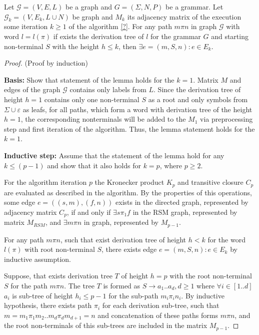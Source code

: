 \begin{lemma}
    \label{lemma:algo:completeness}
    Let $\mathcal{G} = (V,E,L)$ be a graph and  $G = (\Sigma, N, P)$ be a grammar. 
    Let $\mathcal{G}_k = (V,E_k,L \cup N)$ be graph and $M_k$ its adjacency
    matrix of the execution some iteration $k \geq 1$ of the algorithm \ref{?}. 
    For any path $m \pi n$ in graph $\mathcal{G}$ with word $l = l(\pi)$ if 
    exists the derivation tree of $l$ for the grammar $G$ and starting non-terminal
    $S$ with the height $h \leq k$, then $\exists e = (m,S,n): e \in E_k$.

\end{lemma}

\begin{proof}{(Proof by induction)}

    \textbf{Basis:} Show that statement of the lemma holds for the $k = 1$. Matrix
    $M$ and edges of the graph $\mathcal{G}$ contains only labels from $L$. 
    Since the derivation tree of height $h = 1$ contains only one non-terminal 
    $S$ as a root and only symbols from $\Sigma \cup {\varepsilon}$ as leafs, 
    for all paths, which form a word with derivation tree of the height $h = 1$, 
    the corresponding nonterminals will be added to the $M_1$ via preprocessing step
    and first iteration of the algorithm. Thus, the lemma statement holds 
    for the $k = 1$.

    \textbf{Inductive step:} Assume that the statement of the lemma hold for any
    $k \leq (p - 1)$ and show that it also holds for $k = p$, where $p \geq 2$.
    
    For the algorithm iteration $p$ the Kronecker product $K_p$ and transitive
    closure $C_p$ are evaluated as described in the algorithm. By the properties
    of this operations, some edge $e = ((s,m),(f,n))$ exists in the directed
    graph, represented by adjacency matrix $C_p$, if and only if $\exists s
    \pi_1 f$ in the RSM graph, represented by matrix $M_{RSM}$, and 
    $\exists m \pi n$ in graph, represented by $M_{p-1}$. 
    
    For any path $m \pi n$, such that exist derivation tree of height $h < k$ 
    for the word $l(\pi)$ with root non-terminal $S$, there exists edge 
    $e = (m,S,n): e \in E_k$ by inductive assumption.
    
    Suppose, that exists derivation tree $T$ of height $h = p$ with the root 
    non-terminal $S$ for the path $m \pi n$. The tree $T$ is formed as
    $S \to a_1 .. a_d, d \geq 1$ where $\forall i \in [1..d]$ $a_i$ is sub-tree of
    height $h_i \leq p - 1$ for the sub-path $m_i \pi_i n_i$. 
    By inductive hypothesis, there exists path $\pi_i$ for each derivation sub-tree, 
    such that $m = m_1 \pi_1 m_2 .. m_{d} \pi_{d} m_{d+1} = n$ and concatenation 
    of these paths forms $m \pi n$, and the root non-terminals of 
    this sub-trees are included in the matrix $M_{p - 1}$. 
    

\end{proof}
